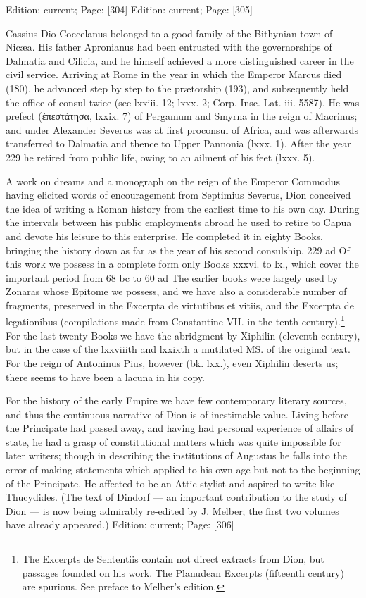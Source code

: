 Edition: current; Page: [304]
Edition: current; Page: [305]



Cassius Dio Coccelanus belonged to a good family of the Bithynian town of Nicæa. His father Apronianus had been entrusted with the governorships of Dalmatia and Cilicia, and he himself achieved a more distinguished career in the civil service. Arriving at Rome in the year in which the Emperor Marcus died (180), he advanced step by step to the prætorship (193), and subsequently held the office of consul twice (see lxxiii. 12; lxxx. 2; Corp. Insc. Lat. iii. 5587). He was prefect (\textgreek{\texthebrew{ἐ}πεστάτησα}, lxxix. 7) of Pergamum and Smyrna in the reign of Macrinus; and under Alexander Severus was at first proconsul of Africa, and was afterwards transferred to Dalmatia and thence to Upper Pannonia (lxxx. 1). After the year 229 he retired from public life, owing to an ailment of his feet (lxxx. 5).

A work on dreams and a monograph on the reign of the Emperor Commodus having elicited words of encouragement from Septimius Severus, Dion conceived the idea of writing a Roman history from the earliest time to his own day. During the intervals between his public employments abroad he used to retire to Capua and devote his leisure to this enterprise. He completed it in eighty Books, bringing the history down as far as the year of his second consulship, 229 ad Of this work we possess in a complete form only Books xxxvi. to lx., which cover the important period from 68 bc to 60 ad The earlier books were largely used by Zonaras whose Epitome we possess, and we have also a considerable number of fragments, preserved in the Excerpta de virtutibus et vitiis, and the Excerpta de legationibus (compilations made from Constantine VII. in the tenth century).\footnote{The Excerpts de Sententiis contain not direct extracts from Dion, but passages founded on his work. The Planudean Excerpts (fifteenth century) are spurious. See preface to Melber\texthebrew{}’s edition.} For the last twenty Books we have the abridgment by Xiphilin (eleventh century), but in the case of the lxxviiith and lxxixth a mutilated MS. of the original text. For the reign of Antoninus Pius, however (bk. lxx.), even Xiphilin deserts us; there seems to have been a lacuna in his copy.

For the history of the early Empire we have few contemporary literary sources, and thus the continuous narrative of Dion is of inestimable value. Living before the Principate had passed away, and having had personal experience of affairs of state, he had a grasp of constitutional matters which was quite impossible for later writers; though in describing the institutions of Augustus he falls into the error of making statements which applied to his own age but not to the beginning of the Principate. He affected to be an Attic stylist and aspired to write like Thucydides. (The text of Dindorf \texthebrew{—} an important contribution to the study of Dion \texthebrew{—} is now being admirably re-edited by J. Melber; the first two volumes have already appeared.)
Edition: current; Page: [306]

